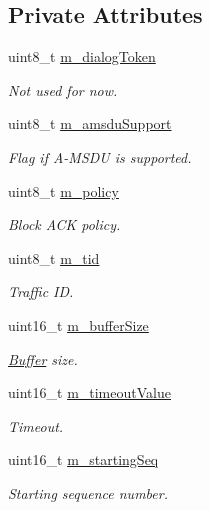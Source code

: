 \subsection*{Private Attributes}
\begin{DoxyCompactItemize}
\item 
uint8\+\_\+t \hyperlink{classns3_1_1MgtAddBaRequestHeader_a52038bda888d12f58a15e808b6fef486}{m\+\_\+dialog\+Token}
\begin{DoxyCompactList}\small\item\em Not used for now. \end{DoxyCompactList}\item 
uint8\+\_\+t \hyperlink{classns3_1_1MgtAddBaRequestHeader_a46d3fea0161258da244407af56ba8a18}{m\+\_\+amsdu\+Support}
\begin{DoxyCompactList}\small\item\em Flag if A-\/\+M\+S\+DU is supported. \end{DoxyCompactList}\item 
uint8\+\_\+t \hyperlink{classns3_1_1MgtAddBaRequestHeader_af3708ea72e307eb08c48fcd1bd36b60e}{m\+\_\+policy}
\begin{DoxyCompactList}\small\item\em Block A\+CK policy. \end{DoxyCompactList}\item 
uint8\+\_\+t \hyperlink{classns3_1_1MgtAddBaRequestHeader_a31067469a11e1397747376a08c1b1e6e}{m\+\_\+tid}
\begin{DoxyCompactList}\small\item\em Traffic ID. \end{DoxyCompactList}\item 
uint16\+\_\+t \hyperlink{classns3_1_1MgtAddBaRequestHeader_a8aee0e0d054334657dd127da85982f8c}{m\+\_\+buffer\+Size}
\begin{DoxyCompactList}\small\item\em \hyperlink{classns3_1_1Buffer}{Buffer} size. \end{DoxyCompactList}\item 
uint16\+\_\+t \hyperlink{classns3_1_1MgtAddBaRequestHeader_adb30ab7abdf354bc3555f49caf9f018c}{m\+\_\+timeout\+Value}
\begin{DoxyCompactList}\small\item\em Timeout. \end{DoxyCompactList}\item 
uint16\+\_\+t \hyperlink{classns3_1_1MgtAddBaRequestHeader_a0deecbd096ed0ce6bc29ffe74d48d39c}{m\+\_\+starting\+Seq}
\begin{DoxyCompactList}\small\item\em Starting sequence number. \end{DoxyCompactList}\end{DoxyCompactItemize}
